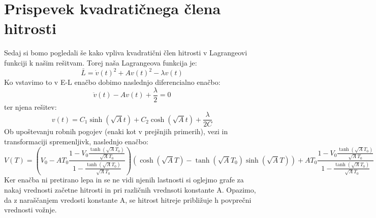 \documentclass[11pt]{article}
\numberwithin{equation}{section} %
\numberwithin{table}{section} %
\begin{document}
\clearpage





\section{Prispevek kvadratičnega člena hitrosti}
Sedaj si bomo pogledali še kako vpliva kvadratični člen hitrosti v Lagrangeovi funkciji k našim rešitvam. Torej naša Lagrangeova funkcija je:
\begin{equation}
\bar{L}=\dot{v}(t)^2+Av(t)^2-\lambda v(t)
\end{equation}
Ko vstavimo to v E-L enačbo dobimo naslednjo diferencialno enačbo:
\begin{equation}
\ddot{v}(t)-Av(t)+\frac{\lambda}{2}=0
\end{equation}
ter njena rešitev:
\begin{equation}
v(t)=C_1 \sinh(\sqrt{A}t)+C_2 \cosh(\sqrt{A}t)+\frac{\lambda}{2C}
\end{equation}
Ob upoštevanju robnih pogojev (enaki kot v prejšnjih primerih), vezi in transformaciji spremenljivk, naslednjo enačbo:
\begin{equation}
V(T)=(V_0-AT_0\frac{1-V_0\frac{\tanh(\sqrt{A}T_0)}{\sqrt{A}T_0}}{1-\frac{\tanh(\sqrt{A}T_0)}{\sqrt{A}T_0}})(\cosh(\sqrt{A}T)-\tanh(\sqrt{A}T_0)\sinh(\sqrt{A}T))+AT_0\frac{1-V_0\frac{\tanh(\sqrt{A}T_0)}{\sqrt{A}T_0}}{1-\frac{\tanh(\sqrt{A}T_0)}{\sqrt{A}T_0}}
\end{equation}
Ker enačba ni pretirano lepa in se ne vidi njenih lastnosti si oglejmo grafe za nakaj vrednosti začetne hitrosti in pri različnih vrednsoti konstante A. Opazimo, da z naraščanjem vredosti konstante A, se hitrost hitreje približuje h povprečni vrednosti vožnje.
\end{document}
